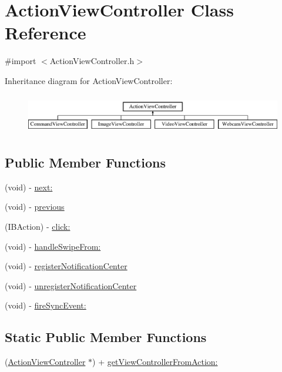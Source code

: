 \hypertarget{interface_action_view_controller}{
\section{ActionViewController Class Reference}
\label{interface_action_view_controller}
}


{\ttfamily \#import $<$ActionViewController.h$>$}

Inheritance diagram for ActionViewController:\begin{figure}[H]
\begin{center}
\leavevmode
\includegraphics[height=1.761006cm]{interface_action_view_controller}
\end{center}
\end{figure}
\subsection*{Public Member Functions}
\begin{DoxyCompactItemize}
\item 
(void) -\/ \hyperlink{interface_action_view_controller_a22edd1eeecdf2f7083df5a807f04cf84}{next:}
\item 
(void) -\/ \hyperlink{interface_action_view_controller_a0b94021bd4ccd4d8f5d939c8fd7ccfb1}{previous}
\item 
(IBAction) -\/ \hyperlink{interface_action_view_controller_ad91d69b4d734bc865ad70666009d7e6c}{click:}
\item 
(void) -\/ \hyperlink{interface_action_view_controller_ac034edbc1c7aff5bde9af09042fce53c}{handleSwipeFrom:}
\item 
(void) -\/ \hyperlink{interface_action_view_controller_a7f364c94977e770c78f9b2e1001c2a87}{registerNotificationCenter}
\item 
(void) -\/ \hyperlink{interface_action_view_controller_ab8fb10dd91608c47c056d05c7dea49d2}{unregisterNotificationCenter}
\item 
(void) -\/ \hyperlink{interface_action_view_controller_a2f99fc0a54c8eea088fe4b54e7921bed}{fireSyncEvent:}
\end{DoxyCompactItemize}
\subsection*{Static Public Member Functions}
\begin{DoxyCompactItemize}
\item 
(\hyperlink{interface_action_view_controller}{ActionViewController} $\ast$) + \hyperlink{interface_action_view_controller_a4509baac610fb3752ee973f0b01e0b9f}{getViewControllerFromAction:}
\end{DoxyCompactItemize}
